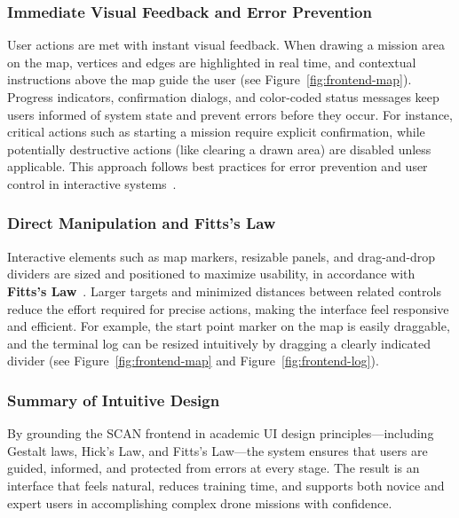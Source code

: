\subsubsection{Immediate Visual Feedback and Error Prevention}

User actions are met with instant visual feedback. When drawing a mission area on the map, vertices and edges are highlighted in real time, and contextual instructions above the map guide the user (see Figure~\ref{fig:frontend-map}). 
Progress indicators, confirmation dialogs, and color-coded status messages keep users informed of system state and prevent errors before they occur. 
For instance, critical actions such as starting a mission require explicit confirmation, while potentially destructive actions (like clearing a drawn area) are disabled unless applicable. 
This approach follows best practices for error prevention and user control in interactive systems~\cite{ui_principles}.

\subsubsection{Direct Manipulation and Fitts’s Law}

Interactive elements such as map markers, resizable panels, and drag-and-drop dividers are sized and positioned to maximize usability, in accordance with \textbf{Fitts’s Law}~\cite{fitts_ui}. 
Larger targets and minimized distances between related controls reduce the effort required for precise actions, making the interface feel responsive and efficient. 
For example, the start point marker on the map is easily draggable, and the terminal log can be resized intuitively by dragging a clearly indicated divider (see Figure~\ref{fig:frontend-map} and Figure~\ref{fig:frontend-log}).

\subsubsection{Summary of Intuitive Design}

By grounding the SCAN frontend in academic UI design principles---including Gestalt laws, Hick’s Law, and Fitts’s Law---the system ensures that users are guided, informed, and protected from errors at every stage. 
The result is an interface that feels natural, reduces training time, and supports both novice and expert users in accomplishing complex drone missions with confidence.

